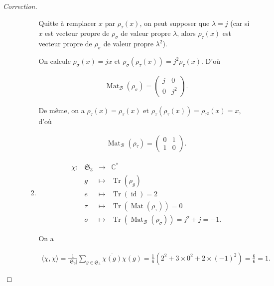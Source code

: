 \documentclass[french]{book}
\theoremstyle{definition}
\theoremstyle{remark}
\begin{document}
\begin{proof}[Correction]
\begin{enumerate}
\begin{enumerate}
\begin{enumerate}
        Quitte à remplacer \(x\) par \(\rho _{\tau}(x)\), on peut supposer que \(\lambda = j\) (car si \(x\) est vecteur propre de \(\rho _{\sigma}\) de valeur propre \(\lambda\), alors \(\rho _{\tau}(x)\) est vecteur propre de \(\rho _{\sigma}\) de valeur propre \(\lambda ^2\)).



        On calcule \(\rho _{\sigma}(x) = jx\) et \(\rho _{\sigma}(\rho _{\tau}(x)) = j ^2 \rho _{\tau}(x)\). D'où

        \begin{gather*}
          \operatorname{Mat}_{\mathcal{B}}(\rho _{\sigma}) = \begin{pmatrix}
          j & 0 \\
          0 & j ^2
          \end{pmatrix}.
        \end{gather*}

        De même, on a \(\rho _{\tau}(x) = \rho _{\tau}(x)\) et \(\rho _{\tau}(\rho _{\tau}(x)) = \rho _{\tau ^2}(x) = x\), d'où

        \begin{gather*}
          \operatorname{Mat} _{\mathcal{B}}(\rho _{\tau}) = \begin{pmatrix}
          0 & 1 \\
          1 & 0
          \end{pmatrix}.
        \end{gather*}
        \item \[\begin{matrix}
        \chi : & \mathfrak{S}_{3} & \longrightarrow & \mathbb{C}^{*} \\
        \ & g & \longmapsto & \operatorname{Tr}(\rho _{g})\\
        \ & e & \longmapsto & \operatorname{Tr}(\operatorname{id}) = 2 \\
        \ & \tau & \longmapsto & \operatorname{Tr}(\operatorname{Mat}(\rho _{\tau})) = 0 \\
        \ & \sigma & \longmapsto & \operatorname{Tr}(\operatorname{Mat} _{\mathcal{B}}(\rho _{\sigma})) = j ^2 + j = -1.
      \end{matrix}\]

        On a

        \begin{gather*}
          \langle \chi, \chi \rangle = \frac{1}{\left\lvert \mathfrak{S}_{3} \right\rvert} \sum_{g \in \mathfrak{S}_{3}} \overline{\chi(g)} \chi(g) = \frac{1}{6}(2 ^2 + 3 \times 0 ^2 + 2 \times(-1) ^2)  = \frac{6}{6} = 1.
        \end{gather*}


\end{enumerate}
\end{enumerate}
\end{enumerate}
\end{proof}
\end{document}

